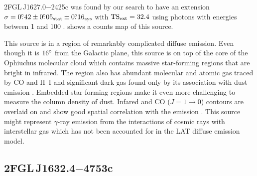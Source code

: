 2FGL\,J1627.0$-$2425c was found by our search to
have an extension $\sigma=0\mbox{$.\!\!^\circ$}42\pm0\mbox{$.\!\!^\circ$}05_\text{stat}\pm0\mbox{$.\!\!^\circ$}16_\text{sys}$ with
$\mathrm{TS}_\mathrm{ext}=32.4$
using photons with energies between 1 \gev and 100 \gev.  
 shows a counts map of this source.

This source is in a region of remarkably complicated diffuse emission.
Even though it is $16^\circ$ from the Galactic plane, this source is on
top of the core of the Ophiuchus molecular cloud which contains massive
star-forming regions that are bright in infrared.  The region also has
abundant molecular and atomic gas traced by CO and H~I and significant 
dark gas found only by its association with dust emission
\citep{grenier_2005a_unveiling-extensive}. Embedded star-forming regions make it even
more challenging to measure the column density of dust.  Infared and 
CO ($J=1\rightarrow 0$)
contours are overlaid on  and show good
spatial correlation with the \gev emission \citep{young_1986a_high-resolution-observations,de-geus_1990a_survey-clouds}.
This source might 
represent $\gamma$-ray emission from the interactions of cosmic rays with
interstellar gas which has not been accounted for in the LAT diffuse
emission model.


\subsection{2FGL\,J1632.4$-$4753c}

